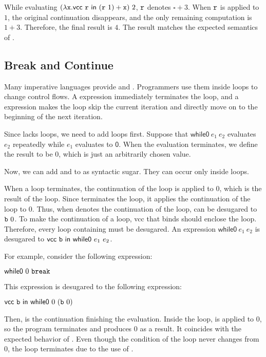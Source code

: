 While evaluating $(\lambda \texttt{x}.\textsf{vcc}\ \texttt{r}\ \textsf{in}\ (\texttt{r}\ 1)+\texttt{x})\ 2$,
$\texttt{r}$ denotes $\square+3$. When $\texttt{r}$ is applied to $1$,
the original continuation disappears, and the only remaining computation is
$1+3$. Therefore, the final result is $4$. The result matches the expected
semantics of .

\subsection{Break and Continue}

Many imperative languages provide  and . Programmers
use them inside loops to change control flows. A  expression
immediately terminates the loop, and a  expression makes the
loop skip the current iteration and directly move on to the beginning of the
next iteration.

Since \lang lacks loops, we need to add loops first.
Suppose that $\textsf{while0}\ e_1\ e_2$ evaluates $e_2$ repeatedly while $e_1$
evaluates to $\textsf{0}$. When the evaluation terminates, we define the result
to be $0$, which is just an arbitrarily chosen value.

Now, we can add  and  to \lang as syntactic
sugar. They can occur only inside loops.

When a loop terminates, the continuation of the loop is applied to $0$, which is
the result of the loop. Since  terminates the loop, it
applies the continuation of the loop to $0$. Thus, when  denotes the
continuation of the loop,  can be desugared to $\texttt{b}\ 0$.
To make  the continuation of a loop, \textsf{vcc} that binds 
should enclose the loop. Therefore, every loop containing  must be
desugared. An expression $\textsf{while0}\ e_1\ e_2$ is desugared to
$\evcc{\code{b}}{\textsf{while0}\ e_1\ e_2}$.

For example, consider the following expression:

$\textsf{while0}\ 0\ \code{break}$

This expression is desugared to the following expression:

$\evcc{\code{b}}{\textsf{while0}\ 0\ (\code{b}\ 0)}$

Then,  is the continuation finishing the evaluation.
Inside the loop,  is applied to $0$, so the program terminates and
produces $0$ as a result. It coincides with the expected behavior of .
Even though the condition of the loop never changes from $0$, the loop
terminates due to the use of .

